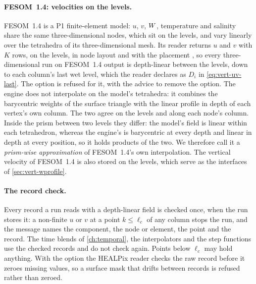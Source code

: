 \paragraph{FESOM~1.4: velocities on the levels.} FESOM~1.4 is a P1 finite-element model: $u$, $v$, $W$,
temperature and salinity share the same three-dimensional nodes, which sit on the levels, and vary
linearly over the tetrahedra of its three-dimensional mesh. Its reader returns $u$ and $v$ with $K$ rows,
on the levels, in node layout and with the placement , so every three-dimensional run on
FESOM~1.4 output is depth-linear between the levels, down to each column's last wet level, which the
reader declares as $D_i$ in \cref{eq:vert-uv-last}. The option  is refused
for it, with the advice to remove the option. The engine does not interpolate on the model's tetrahedra:
it combines the barycentric weights of the surface triangle with the linear profile in depth of each
vertex's own column. The two agree on the levels and along each node's column. Inside the prism between
two levels they differ: the model's field is linear within each tetrahedron, whereas the engine's is
barycentric at every depth and linear in depth at every position, so it holds products of the two. We
therefore call it a \emph{prism-wise approximation} of FESOM~1.4's own interpolation. The vertical
velocity of FESOM~1.4 is also stored on the levels, which serve as the interfaces of
\cref{sec:vert-wprofile}.

\paragraph{The record check.} Every record a run reads with a depth-linear field is checked once, when the
run stores it: a non-finite $u$ or $v$ at a point $k\le\ell_c$ of any column stops the run, and the message
names the component, the node or element, the point and the record. The time blends of
\cref{ch:temporal}, the interpolators and the step functions use the checked records and do not check
again. Points below $\ell_c$ may hold anything. With the option the HEALPix reader checks the raw record before it zeroes
missing values, so a surface mask that drifts between records is refused rather than zeroed.

